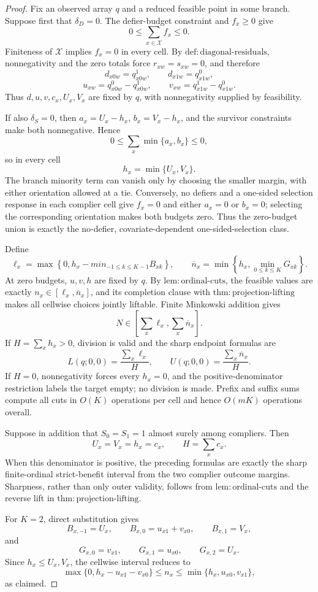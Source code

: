 \documentclass{article}
\begin{document}
\begin{proof}
Fix an observed array \(q\) and a reduced feasible point in some branch. Suppose first that \(\delta_D=0\). The defier-budget constraint and \(f_x\geq0\) give
\[
 0\leq\sum_{x\in\mathcal X}f_x\leq0.
\]
Finiteness of \(\mathcal X\) implies \(f_x=0\) in every cell. By \(\mathrm{def:diagonal\text{-}residuals}\), nonnegativity and the zero totals force \(r_{xw}=s_{xw}=0\), and therefore
\[
 d_{x0w}=q^1_{x0w},
 \qquad d_{x1w}=q^0_{x1w},
\]
\[
 u_{xw}=q^0_{x0w}-q^1_{x0w},
 \qquad v_{xw}=q^1_{x1w}-q^0_{x1w}.
\]
Thus \(d,u,v,c_x,U_x,V_x\) are fixed by \(q\), with nonnegativity supplied by feasibility.

If also \(\delta_S=0\), then \(a_x=U_x-h_x\), \(b_x=V_x-h_x\), and the survivor constraints make both nonnegative. Hence
\[
 0\leq\sum_x\min\{a_x,b_x\}\leq0,
\]
so in every cell
\[
 h_x=\min\{U_x,V_x\}.
\]
The branch minority term can vanish only by choosing the smaller margin, with either orientation allowed at a tie. Conversely, no defiers and a one-sided selection response in each complier cell give \(f_x=0\) and either \(a_x=0\) or \(b_x=0\); selecting the corresponding orientation makes both budgets zero. Thus the zero-budget union is exactly the no-defier, covariate-dependent one-sided-selection class.

Define
\[
 \ell_x=\max\left\{0,h_x-min_{-1\leq k\leq K-1}B_{xk}\right\},
 \qquad
 \overline n_x=\min\left\{h_x,\min_{0\leq k\leq K}G_{xk}\right\}.
\]
At zero budgets, \(u,v,h\) are fixed by \(q\). By \(\mathrm{lem:ordinal\text{-}cuts}\), the feasible values are exactly \(n_x\in[\ell_x,\overline n_x]\), and its completion clause with \(\mathrm{thm:projection\text{-}lifting}\) makes all cellwise choices jointly liftable. Finite Minkowski addition gives
\[
 N\in\left[\sum_x\ell_x,\sum_x\overline n_x\right].
\]
If \(H=\sum_xh_x>0\), division is valid and the sharp endpoint formulas are
\[
 L(q;0,0)=\frac{\sum_x\ell_x}{H},
 \qquad
 U(q;0,0)=\frac{\sum_x\overline n_x}{H}.
\]
If \(H=0\), nonnegativity forces every \(h_x=0\), and the positive-denominator restriction labels the target empty; no division is made. Prefix and suffix sums compute all cuts in \(O(K)\) operations per cell and hence \(O(mK)\) operations overall.

Suppose in addition that \(S_0=S_1=1\) almost surely among compliers. Then
\[
 U_x=V_x=h_x=c_x,
 \qquad H=\sum_xc_x.
\]
When this denominator is positive, the preceding formulas are exactly the sharp finite-ordinal strict-benefit interval from the two complier outcome margins. Sharpness, rather than only outer validity, follows from \(\mathrm{lem:ordinal\text{-}cuts}\) and the reverse lift in \(\mathrm{thm:projection\text{-}lifting}\).

For \(K=2\), direct substitution gives
\[
 B_{x,-1}=U_x,
 \qquad B_{x,0}=u_{x1}+v_{x0},
 \qquad B_{x,1}=V_x,
\]
and
\[
 G_{x,0}=v_{x1},
 \qquad G_{x,1}=u_{x0},
 \qquad G_{x,2}=U_x.
\]
Since \(h_x\leq U_x,V_x\), the cellwise interval reduces to
\[
 \max\{0,h_x-u_{x1}-v_{x0}\}
 \leq n_x\leq
 \min\{h_x,u_{x0},v_{x1}\},
\]
as claimed.
\end{proof}
\end{document}
